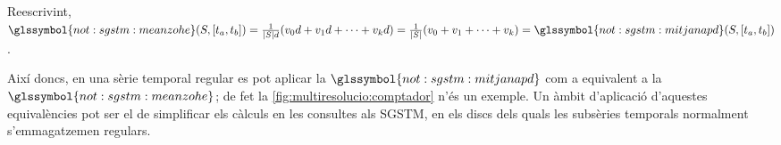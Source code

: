 Reescrivint, $\glssymbol{not:sgstm:meanzohe}(S,[t_a,t_b])=
\frac{1}{|S|d} ( v_0d+v_1d+\dotsb+ v_kd ) = \frac{1}{|S|} (
v_0+v_1+\dotsb+ v_k ) = \glssymbol{not:sgstm:mitjanapd}(S,[t_a,t_b])$.



Així doncs, en una sèrie temporal regular es pot aplicar la
$\glssymbol{not:sgstm:mitjanapd}$ com a equivalent a la
$\glssymbol{not:sgstm:meanzohe}$; de fet la
\autoref{fig:multiresolucio:comptador} n'és un exemple. Un àmbit
d'aplicació d'aquestes equivalències pot ser el de simplificar els
càlculs en les consultes als \gls{SGSTM}, en els discs dels quals les
subsèries temporals normalment s'emmagatzemen regulars.
 










